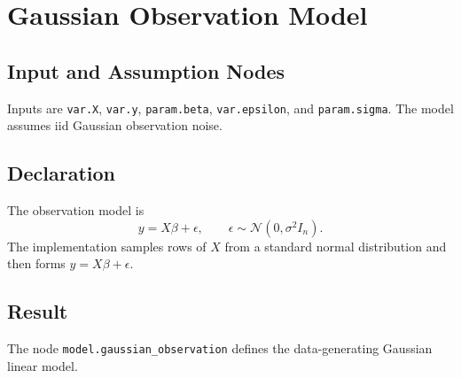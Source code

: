 \section{Gaussian Observation Model}
\label{model:gaussian-observation}

\subsection{Input and Assumption Nodes}
Inputs are \texttt{var.X}, \texttt{var.y}, \texttt{param.beta}, \texttt{var.epsilon}, and \texttt{param.sigma}. The model assumes iid Gaussian observation noise.

\subsection{Declaration}
The observation model is
\[
  y = X\beta + \epsilon,
  \qquad
  \epsilon \sim \mathcal{N}(0,\sigma^2 I_n).
\]
The implementation samples rows of \(X\) from a standard normal distribution and then forms \(y=X\beta+\epsilon\).

\subsection{Result}
The node \texttt{model.gaussian\_observation} defines the data-generating Gaussian linear model.
